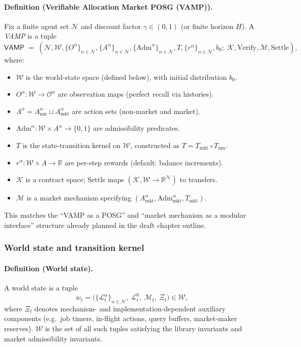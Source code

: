 \paragraph{Definition (Verifiable Allocation Market POSG (VAMP)).}
Fix a finite agent set \(\mathcal{N}\) and discount factor \(\gamma\in(0,1)\) (or finite horizon \(H\)). A \emph{VAMP} is a tuple
\[
\mathsf{VAMP} \;=\;
(\mathcal{N},\mathcal{W},\{O^\alpha\}_{\alpha\in\mathcal{N}},
\{A^\alpha\}_{\alpha\in\mathcal{N}},
\{\mathrm{Adm}^\alpha\}_{\alpha\in\mathcal{N}},
T,\{r^\alpha\}_{\alpha\in\mathcal{N}},b_0;\;
\mathcal{K},\mathrm{Verify},\mathcal{M},\mathrm{Settle}),
\]
where:
\begin{itemize}
\item \(\mathcal{W}\) is the world-state space (defined below), with initial distribution \(b_0\).
\item \(O^\alpha:\mathcal{W}\to\mathcal{O}^\alpha\) are observation maps (perfect recall via histories).
\item \(A^\alpha=A^\alpha_{\mathrm{nm}}\sqcup A^\alpha_{\mathrm{mkt}}\) are action sets (non-market and market).
\item \(\mathrm{Adm}^\alpha:\mathcal{W}\times A^\alpha\to\{0,1\}\) are admissibility predicates.
\item \(T\) is the state-transition kernel on \(\mathcal{W}\), constructed as \(T=T_{\mathrm{mkt}}\circ T_{\mathrm{nm}}\).
\item \(r^\alpha:\mathcal{W}\times A\to\mathbb{R}\) are per-step rewards (default: balance increments).
\item \(\mathcal{K}\) is a contract space; \(\mathrm{Settle}\) maps \((\mathcal{K},\mathcal{W}\to\mathbb{R}^{\mathcal{N}})\) to transfers.
\item \(\mathcal{M}\) is a market mechanism specifying \((A^\alpha_{\mathrm{mkt}},\mathrm{Adm}^\alpha_{\mathrm{mkt}},T_{\mathrm{mkt}})\).
\end{itemize}

This matches the ``VAMP as a POSG'' and ``market mechanism as a modular interface'' structure already planned in the draft chapter outline.

\subsubsection{World state and transition kernel}

\paragraph{Definition (World state).}
A world state is a tuple
\[
w_t=\Big(\{\mathcal{L}_t^\alpha\}_{\alpha\in\mathcal{N}},\ \mathcal{L}_t^0,\ \mathcal{M}_t,\ \Xi_t\Big)\in\mathcal{W},
\]
where \(\Xi_t\) denotes mechanism- and implementation-dependent auxiliary components (e.g.\ job timers, in-flight actions, query buffers, market-maker reserves). \(\mathcal{W}\) is the set of all such tuples satisfying the library invariants and market admissibility invariants.

